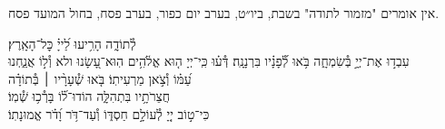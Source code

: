 \documentclass[twoside, openany, parskip=half, 11pt]{book}
\begin{document}
\begin{narrow}
\begin{scriptsize} %
\textsf{
אין אומרים "מזמור לתודה" בשבת, ביו״ט, בערב יום כפור, בערב פסח, בחול המועד פסח.\\
}\end{scriptsize}
 לְ֯תוֹדָ֑ה \hfill
הָרִ֥יעוּ לַ֝ייָ֗ כׇּל־הָאָֽרֶץ׃\\
עִבְד֣וּ אֶת־יְיָ֣ בְּ֯שִׂמְחָ֑ה \hfill בֹּ֥אוּ לְ֯֝פָנָ֗יו בִּרְנָנָֽה׃
דְּ֯ע֗וּ כִּֽי־יְיָ ה֤וּא אֱלֹ֫הִ֥ים \hfill הֽוּא־עָ֭שָׂנוּ ולא וְ֯ל֣וֹ אֲנַ֑חְנוּ\\ עַ֝מּ֗וֹ וְ֯צֹ֣אן מַרְעִיתֽוֹ׃ \hfill
בֹּ֤אוּ שְׁ֯עָרָ֨יו ׀ בְּ֯תוֹדָ֗ה \\ חֲצֵרֹתָ֥יו בִּתְהִלָּ֑ה \hfill הוֹדוּ־ל֗֝וֹ בָּרְ֯כ֥וּ שְׁ֯מֽוֹ׃\\
כִּי־ט֣וֹב יְיָ֭ לְ֯עוֹלָ֣ם חַסְדּ֑וֹ \hfill וְ֯עַד־דֹּ֥ר וָ֝דֹ֗ר אֱמוּנָתֽוֹ׃
\end{narrow}
\end{document}
